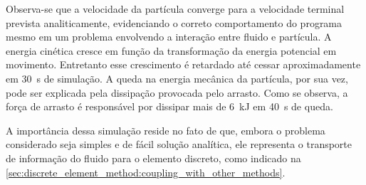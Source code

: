 Observa-se que a velocidade da partícula converge para a velocidade terminal prevista analiticamente, evidenciando o correto comportamento do programa mesmo em um problema envolvendo a interação entre fluido e partícula. A energia cinética cresce em função da transformação da energia potencial em movimento. Entretanto esse crescimento é retardado até cessar aproximadamente em \SI{30}{\second} de simulação. A queda na energia mecânica da partícula, por sua vez, pode ser explicada pela dissipação provocada pelo arrasto. Como se observa, a força de arrasto é responsável por dissipar mais de \SI{6}{\kilo\joule} em \SI{40}{\second} de queda.

A importância dessa simulação reside no fato de que, embora o problema considerado seja simples e de fácil solução analítica, ele representa o transporte de informação do fluido para o elemento discreto, como indicado na \cref{sec:discrete_element_method:coupling_with_other_methods}.

